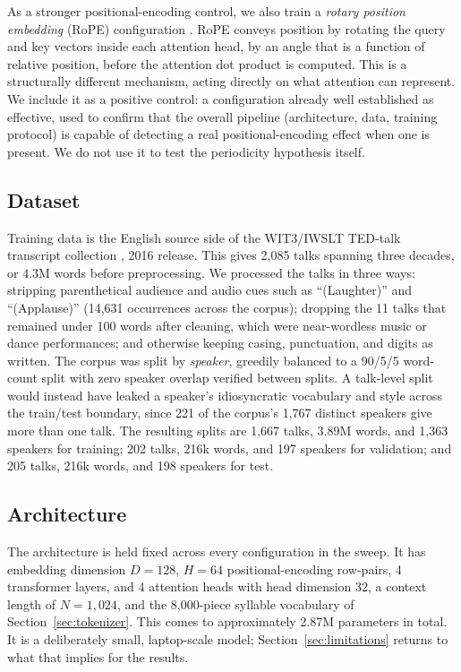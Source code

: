 \documentclass[11pt]{article}
\begin{document}
As a stronger positional-encoding control, we also train a \emph{rotary position embedding} (RoPE) configuration \citep{su2021roformer}. RoPE conveys position by rotating the query and key vectors inside each attention head, by an angle that is a function of relative position, before the attention dot product is computed. This is a structurally different mechanism, acting directly on what attention can represent. We include it as a positive control: a configuration already well established as effective, used to confirm that the overall pipeline (architecture, data, training protocol) is capable of detecting a real positional-encoding effect when one is present. We do not use it to test the periodicity hypothesis itself.

\subsection{Dataset}
\label{sec:dataset}

Training data is the English source side of the WIT3/IWSLT TED-talk transcript collection \citep{cettolo2012wit3}, 2016 release. This gives 2{,}085 talks spanning three decades, or $4.3$M words before preprocessing. We processed the talks in three ways: stripping parenthetical audience and audio cues such as ``(Laughter)'' and ``(Applause)'' (14{,}631 occurrences across the corpus); dropping the 11 talks that remained under 100 words after cleaning, which were near-wordless music or dance performances; and otherwise keeping casing, punctuation, and digits as written. The corpus was split by \emph{speaker}, greedily balanced to a 90/5/5 word-count split with zero speaker overlap verified between splits. A talk-level split would instead have leaked a speaker's idiosyncratic vocabulary and style across the train/test boundary, since 221 of the corpus's 1{,}767 distinct speakers give more than one talk. The resulting splits are 1{,}667 talks, 3.89M words, and 1{,}363 speakers for training; 202 talks, 216k words, and 197 speakers for validation; and 205 talks, 216k words, and 198 speakers for test.

\subsection{Architecture}

The architecture is held fixed across every configuration in the sweep. It has embedding dimension $D = 128$, $H = 64$ positional-encoding row-pairs, 4 transformer layers, and 4 attention heads with head dimension 32, a context length of $N = 1{,}024$, and the 8{,}000-piece syllable vocabulary of Section~\ref{sec:tokenizer}. This comes to approximately 2.87M parameters in total. It is a deliberately small, laptop-scale model; Section~\ref{sec:limitations} returns to what that implies for the results.
\end{document}
